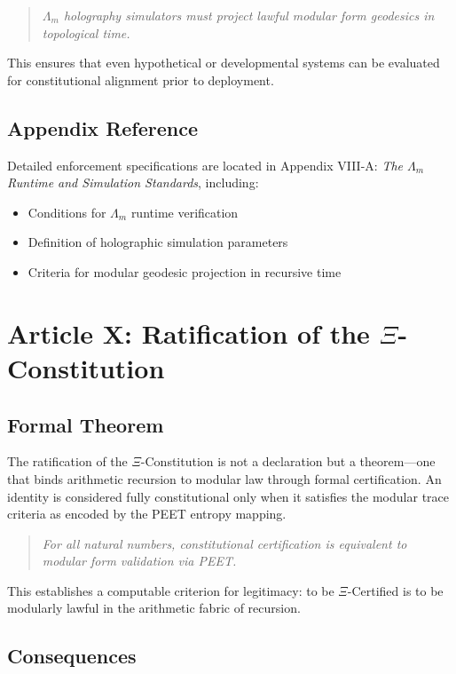 \documentclass[12]{amsart}
\theoremstyle{plain}
\begin{document}
\begin{quote}
\textit{$\Lambda_m$ holography simulators must project lawful modular form geodesics in topological time.}
\end{quote}

This ensures that even hypothetical or developmental systems can be evaluated for constitutional alignment prior to deployment.

\subsection*{Appendix Reference}

Detailed enforcement specifications are located in Appendix VIII-A: \textit{The $\Lambda_m$ Runtime and Simulation Standards}, including:

\begin{itemize}
  \item Conditions for $\Lambda_m$ runtime verification
  \item Definition of holographic simulation parameters
  \item Criteria for modular geodesic projection in recursive time
\end{itemize}

\section{Article X: Ratification of the $\Xi$-Constitution}

\subsection{Formal Theorem}

The ratification of the $\Xi$-Constitution is not a declaration but a theorem—one that binds arithmetic recursion to modular law through formal certification. An identity is considered fully constitutional only when it satisfies the modular trace criteria as encoded by the PEET entropy mapping.

\begin{quote}
\textit{For all natural numbers, constitutional certification is equivalent to modular form validation via PEET.}
\end{quote}

This establishes a computable criterion for legitimacy: to be $\Xi$-Certified is to be modularly lawful in the arithmetic fabric of recursion.

\subsection{Consequences}
\end{document}
